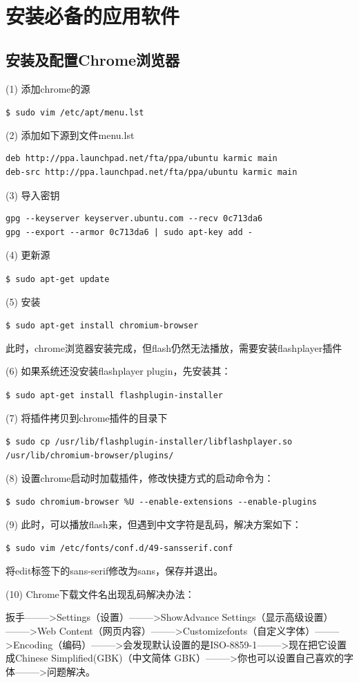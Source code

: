 \section{安装必备的应用软件}
\subsection{安装及配置Chrome浏览器}
(1) 添加chrome的源

\verb"$ sudo vim /etc/apt/menu.lst"

(2) 添加如下源到文件menu.lst
\begin{verbatim}
deb http://ppa.launchpad.net/fta/ppa/ubuntu karmic main
deb-src http://ppa.launchpad.net/fta/ppa/ubuntu karmic main
\end{verbatim}

(3) 导入密钥
\begin{verbatim}
gpg --keyserver keyserver.ubuntu.com --recv 0c713da6
gpg --export --armor 0c713da6 | sudo apt-key add -
\end{verbatim}

(4) 更新源

\verb"$ sudo apt-get update"

(5) 安装

\verb"$ sudo apt-get install chromium-browser"

此时，chrome浏览器安装完成，但flash仍然无法播放，需要安装flashplayer插件

(6) 如果系统还没安装flashplayer plugin，先安装其：

\verb"$ sudo apt-get install flashplugin-installer"

(7) 将插件拷贝到chrome插件的目录下

\verb"$ sudo cp /usr/lib/flashplugin-installer/libflashplayer.so /usr/lib/chromium-browser/plugins/"

(8) 设置chrome启动时加载插件，修改快捷方式的启动命令为：

\verb"$ sudo chromium-browser %U --enable-extensions --enable-plugins"

(9) 此时，可以播放flash来，但遇到中文字符是乱码，解决方案如下：

\verb"$ sudo vim /etc/fonts/conf.d/49-sansserif.conf"

将edit标签下的sans-serif修改为sans，保存并退出。

(10) Chrome下载文件名出现乱码解决办法：

扳手-------->Settings（设置）-------->ShowAdvance Settings（显示高级设置）-------->Web Content（网页内容）-------->Customizefonts（自定义字体）-------->Encoding（编码）-------->会发现默认设置的是ISO-8859-1-------->现在把它设置成Chinese Simplified(GBK)（中文简体 GBK）-------->你也可以设置自己喜欢的字体-------->问题解决。


